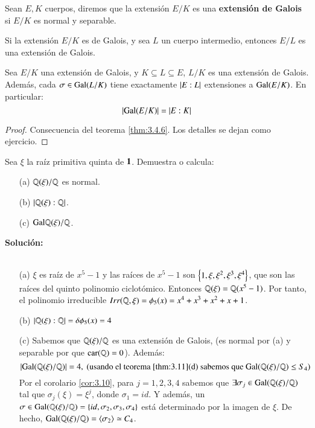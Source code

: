 \begin{dfn}
    Sean $E, K$ cuerpos, diremos que la extensión $E/K$ es una \textbf{extensión de Galois} si $E/K$ es normal y separable.
\end{dfn}
\begin{obs}
    Si la extensión $E/K$ es de Galois, y sea $L$ un cuerpo intermedio, entonces $E/L$ es una extensión de Galois.
\end{obs}

\begin{cor}\label{cor:3.4.7}
    Sea $E/K$ una extensión de Galois, y $K \subseteq L \subseteq E$, $L/K$ es una extensión de Galois. Además, cada $\sigma \in \mathrm{Gal}(L/K)$ tiene exactamente $\left|E:L\right|$ extensiones a $\mathrm{Gal}(E/K)$. En particular:
    $$
        \left|\mathrm{Gal}(E/K)\right| = \left|E:K\right|
    $$
\end{cor}
\begin{proof}
    Consecuencia del teorema \ref{thm:3.4.6}. Los detalles se dejan como ejercicio.
\end{proof}

\begin{ex}[Ejercicio] %
    Sea $\xi$ la raíz primitiva quinta de $\mathbf{1}$. Demuestra o calcula:
    \begin{itemize}
        \item[(a)] $\mathbb{Q}(\xi)/\mathbb{Q}$ es normal.
        \item[(b)] $\left|\mathbb{Q}(\xi):\mathbb{Q}\right|$.
        \item[(c)] $\mathrm{Gal}{\mathbb{Q}(\xi)/\mathbb{Q}}$.
    \end{itemize}

    \textbf{Solución:}\\\\
    \begin{itemize}
        \item[(a)] $\xi$ es raíz de $x^5 - 1$ y las raíces de $x^5 - 1$ son $\left\{1, \xi, \xi^2, \xi^3, \xi^4\right\}$, que son las raíces del quinto polinomio ciclotómico. Entonces $\mathbb{Q}(\xi) = \mathbb{Q}(x^5 - 1)$. Por tanto, el polinomio irreducible $Irr(\mathbb{Q}, \xi) = \phi_5(x) = x^4 + x^3 + x^2 + x + 1$.
        \item[(b)] $\left|\mathbb{Q}(\xi):\mathbb{Q}\right| = \delta \phi_5(x) = 4$
        \item[(c)] Sabemos que $\mathbb{Q}(\xi)/\mathbb{Q}$ es una extensión de Galois, (es normal por (a)  y separable por que $\mathrm{car}(\mathbb{Q}) = 0$). Además:
        $$
            \left|\mathrm{Gal}(\mathbb{Q}(\xi)/\mathbb{Q})\right| = 4, \text{ (usando el teorema \ref{thm:3.11}(d) sabemos que } \mathrm{Gal}(\mathbb{Q}(\xi)/\mathbb{Q}) \leq S_4 \text{)}
        $$
        Por el corolario \ref{cor:3.10}, para $j = 1, 2, 3, 4$ sabemos que $\exists \sigma_j \in \mathrm{Gal}(\mathbb{Q}(\xi)/\mathbb{Q})$ tal que $\sigma_j(\xi) = \xi^j$, donde $\sigma_1 = id$. Y además, un $\sigma \in \mathrm{Gal}(\mathbb{Q}(\xi)/\mathbb{Q}) = \left\{id, \sigma_2, \sigma_3, \sigma_4\right\}$ está determinado por la imagen de $\xi$. De hecho, $\mathrm{Gal}(\mathbb{Q}(\xi)/\mathbb{Q}) = \langle\sigma_2\rangle \simeq C_4$.
    \end{itemize}
\end{ex}

